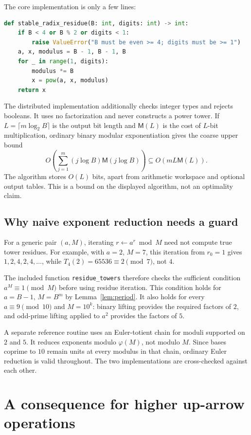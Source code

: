 \documentclass[11pt,letterpaper]{article}
\numberwithin{equation}{section}
\theoremstyle{definition}
\theoremstyle{remark}
\begin{document}
The core implementation is only a few lines:
\begin{lstlisting}[language=Python]
def stable_radix_residue(B: int, digits: int) -> int:
    if B < 4 or B % 2 or digits < 1:
        raise ValueError("B must be even >= 4; digits must be >= 1")
    a, x, modulus = B - 1, B - 1, B
    for _ in range(1, digits):
        modulus *= B
        x = pow(a, x, modulus)
    return x
\end{lstlisting}
The distributed implementation additionally checks integer types and rejects booleans. It uses no factorization and never constructs a power tower. If $L=\lceil m\log_2B\rceil$ is the output bit length and $\mathsf M(L)$ is the cost of $L$-bit multiplication, ordinary binary modular exponentiation gives the coarse upper bound
\[
 O\!\left(\sum_{j=1}^m (j\log B)\mathsf M(j\log B)\right)
 \subseteq O(mL\mathsf M(L)).
\]
The algorithm stores $O(L)$ bits, apart from arithmetic workspace and optional output tables. This is a bound on the displayed algorithm, not an optimality claim.

\subsection{Why naive exponent reduction needs a guard}

For a generic pair $(a,M)$, iterating $r\leftarrow a^r\bmod M$ need not compute true tower residues. For example, with $a=2$, $M=7$, this iteration from $r_0=1$ gives $1,2,4,2,4,\ldots$, while $T_4(2)=65536\equiv2\pmod7$, not $4$.

The included function \texttt{residue\_towers} therefore checks the sufficient condition $a^M\equiv1\pmod M$ before using residue iteration. This condition holds for $a=B-1$, $M=B^m$ by Lemma~\ref{lem:period}. It also holds for every $a\equiv9\pmod{10}$ and $M=10^k$: binary lifting provides the required factors of $2$, and odd-prime lifting applied to $a^2$ provides the factors of $5$.

A separate reference routine uses an Euler-totient chain for moduli supported on $2$ and $5$. It reduces exponents modulo $\varphi(M)$, not modulo $M$. Since bases coprime to $10$ remain units at every modulus in that chain, ordinary Euler reduction is valid throughout. The two implementations are cross-checked against each other.

\section{A consequence for higher up-arrow operations}\label{sec:arrows}
\end{document}
